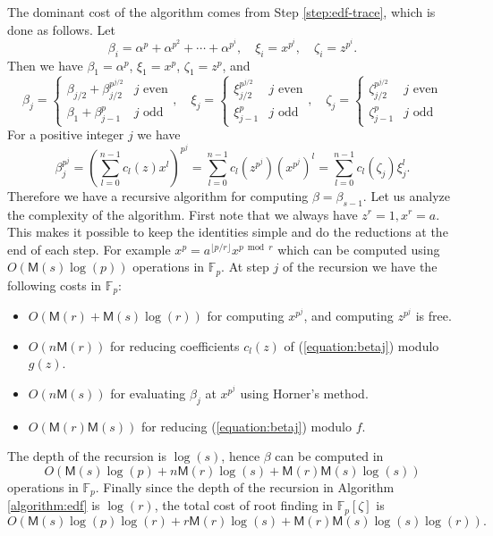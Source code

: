 \documentclass[12pt]{article}
\theoremstyle{plain}
\theoremstyle{definition}
\def\F{\mathbb{F}}
\def\M{\mathsf{M}}
\newcounter{algorithm}
\begin{document}
The dominant cost of the algorithm comes from Step \ref{step:edf-trace}, which is done as follows. Let
\[ \beta_i = \alpha^p + \alpha^{p^2} + \cdots + \alpha^{p^i}, \quad \xi_i = x^{p^i}, \quad \zeta_i = z^{p^i}. \]
Then we have $\beta_1 = \alpha^p$, $\xi_1 = x^p$, $\zeta_1 = z^p$, and
\[
\beta_j = 
\begin{cases}
	\beta_{j / 2} + \beta_{j / 2}^{p^{j / 2}} & j \text{ even} \\
	\beta_1 + \beta_{j - 1}^p & j \text{ odd}
\end{cases}, \quad
\xi_j = 
\begin{cases}
	\xi_{j / 2}^{p^{j / 2}} & j \text{ even} \\
	\xi_{j - 1}^p & j \text{ odd}
\end{cases}, \quad
\zeta_j = 
\begin{cases}
	\zeta_{j / 2}^{p^{j / 2}} & j \text{ even} \\
	\zeta_{j - 1}^p & j \text{ odd}
\end{cases}
\]
For a positive integer $j$ we have
\begin{equation}
\label{equation:betaj}
	\beta_j^{p^j} = \left( \sum_{l = 0}^{n - 1}c_l(z)x^l \right)^{p^j} = \sum_{l = 0}^{n - 1}c_l(z^{p^j})(x^{p^j})^l = \sum_{l = 0}^{n - 1}c_l(\zeta_j)\xi_j^l.
\end{equation}
Therefore we have a recursive algorithm for computing $\beta = \beta_{s - 1}$. Let us analyze the complexity of the algorithm. First note that we always have $z^r = 1, x^r = a$. This makes it possible to keep the identities simple and do the reductions at the end of each step. For example $x^p = a^{\lfloor p / r\rfloor}x^{p \bmod r}$ which can be computed using $O(\M(s)\log(p))$ operations in $\F_p$. At step $j$ of the recursion we have the following costs in $\F_p$:
\begin{itemize}
	\item $O(\M(r) + \M(s)\log(r))$ for computing $x^{p^j}$, and computing $z^{p^j}$ is free.
	\item $O(n\M(r))$ for reducing coefficients $c_l(z)$ of (\ref{equation:betaj}) modulo $g(z)$.
	\item $O(n\M(s))$ for evaluating $\beta_j$ at $x^{p^j}$ using Horner's method.
	\item $O(\M(r)\M(s))$ for reducing (\ref{equation:betaj}) modulo $f$.
\end{itemize}
The depth of the recursion is $\log(s)$, hence $\beta$ can be computed in 
\[O(\M(s)\log(p) + n\M(r)\log(s) + \M(r)\M(s)\log(s)) \]
operations in $\F_p$. Finally since the depth of the recursion in Algorithm \ref{algorithm:edf} is $\log(r)$, the total cost of root finding in $\F_p[\zeta]$ is 
\[ O(\M(s)\log(p)\log(r) + r\M(r)\log(s) + \M(r)\M(s)\log(s)\log(r)). \]
\end{document}
